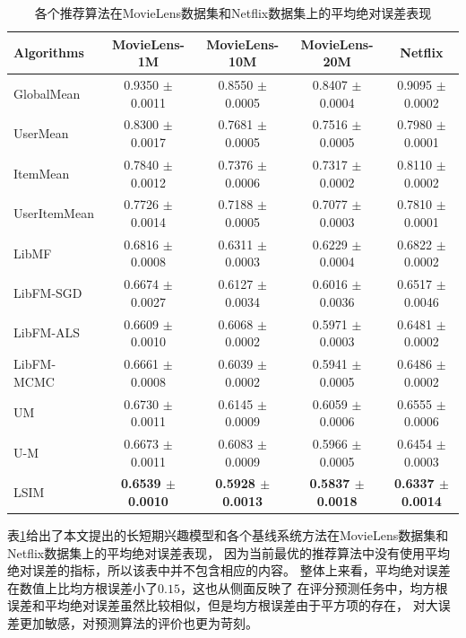 \begin{table}[htbp]
    \centering
    \caption{各个推荐算法在MovieLens数据集和Netflix数据集上的平均绝对误差表现}
    \label{tab:mae}
    \begin{tabular}{|l|c|c|c|c|}
        \hline
        \textbf{Algorithms} & \textbf{MovieLens-1M} & \textbf{MovieLens-10M} & \textbf{MovieLens-20M} & \textbf{Netflix} \\
        \hline
        GlobalMean   & 0.9350 $\pm$ 0.0011 & 0.8550 $\pm$ 0.0005 & 0.8407 $\pm$ 0.0004 & 0.9095 $\pm$ 0.0002 \\
        UserMean     & 0.8300 $\pm$ 0.0017 & 0.7681 $\pm$ 0.0005 & 0.7516 $\pm$ 0.0005 & 0.7980 $\pm$ 0.0001 \\
        ItemMean     & 0.7840 $\pm$ 0.0012 & 0.7376 $\pm$ 0.0006 & 0.7317 $\pm$ 0.0002 & 0.8110 $\pm$ 0.0002 \\
        UserItemMean & 0.7726 $\pm$ 0.0014 & 0.7188 $\pm$ 0.0005 & 0.7077 $\pm$ 0.0003 & 0.7810 $\pm$ 0.0001 \\
        \hline
        LibMF        & 0.6816 $\pm$ 0.0008 & 0.6311 $\pm$ 0.0003 & 0.6229 $\pm$ 0.0004 & 0.6822 $\pm$ 0.0002 \\
        \hline
        LibFM-SGD    & 0.6674 $\pm$ 0.0027 & 0.6127 $\pm$ 0.0034 & 0.6016 $\pm$ 0.0036 & 0.6517 $\pm$ 0.0046 \\
        LibFM-ALS    & 0.6609 $\pm$ 0.0010 & 0.6068 $\pm$ 0.0002 & 0.5971 $\pm$ 0.0003 & 0.6481 $\pm$ 0.0002 \\
        LibFM-MCMC   & 0.6661 $\pm$ 0.0008 & 0.6039 $\pm$ 0.0002 & 0.5941 $\pm$ 0.0005 & 0.6486 $\pm$ 0.0002 \\
        \hline
        UM           & 0.6730 $\pm$ 0.0011 & 0.6145 $\pm$ 0.0009 & 0.6059 $\pm$ 0.0006 & 0.6555 $\pm$ 0.0006 \\
        U-M          & 0.6673 $\pm$ 0.0011 & 0.6083 $\pm$ 0.0009 & 0.5966 $\pm$ 0.0005 & 0.6454 $\pm$ 0.0003 \\
        \hline
        LSIM         & \textbf{0.6539 $\pm$ 0.0010} & \textbf{0.5928 $\pm$ 0.0013} & \textbf{0.5837 $\pm$ 0.0018} & \textbf{0.6337 $\pm$ 0.0014} \\
        \hline
    \end{tabular}
\end{table}

表\ref{tab:mae}给出了本文提出的长短期兴趣模型和各个基线系统方法在MovieLens数据集和Netflix数据集上的平均绝对误差表现，
因为当前最优的推荐算法中没有使用平均绝对误差的指标，所以该表中并不包含相应的内容。
整体上来看，平均绝对误差在数值上比均方根误差小了$0.15$，这也从侧面反映了
在评分预测任务中，均方根误差和平均绝对误差虽然比较相似，但是均方根误差由于平方项的存在，
对大误差更加敏感，对预测算法的评价也更为苛刻。

